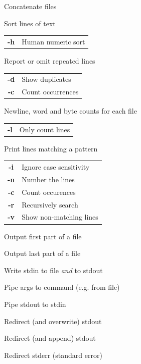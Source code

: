 \documentclass[12pt, a4paper]
{article}
\begin{document}
\begin{multicols}{3}
\begin{description}[nolistsep]
	\item[cat] Concatenate files
	\item[sort] Sort lines of text
	\item
	\begin{tabular}{cl}
		{\large \ttfamily \textbf{-h}} & Human numeric sort
	\end{tabular}
	\item[uniq] Report or omit repeated lines
	\item
	\begin{tabular}{cl}
		{\large \ttfamily \textbf{-d}} & Show duplicates \\
		{\large \ttfamily \textbf{-c}} & Count occurrences
	\end{tabular}
	\item[wc] Newline, word and byte counts for each file
	\item
	\begin{tabular}{cl}
		{\large \ttfamily \textbf{-l}} & Only count lines
	\end{tabular}
	\item[grep] Print lines matching a pattern
	\item
	\begin{tabular}{cl}
		{\large \ttfamily \textbf{-i}} & Ignore case sensitivity \\
		{\large \ttfamily \textbf{-n}} & Number the lines \\
		{\large \ttfamily \textbf{-c}} & Count occurences \\
		{\large \ttfamily \textbf{-r}} & Recursively search \\
		{\large \ttfamily \textbf{-v}} & Show non-matching lines
	\end{tabular}
	\item[head] Output first part of a file
	\item[tail] Output last part of a file
	\item[tee] Write stdin to file \emph{and} to stdout
	\item[xargs] Pipe args to command (e.g. from file)
\end{description}


\begin{description}[nolistsep]
	\item[|] Pipe stdout to stdin
	\item[>] Redirect (and overwrite) stdout
	\item[>>] Redirect (and append) stdout 
	\item[2>] Redirect stderr (standard error)
\end{description}


\end{multicols}
\end{document}
